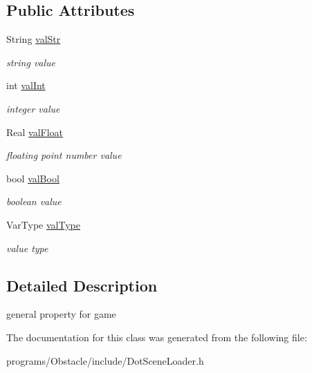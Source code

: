 \subsection*{Public Attributes}
\begin{DoxyCompactItemize}
\item 
String \hyperlink{class_ogre_1_1_general_property_a3e9138cfd8008b21c7cb5c8a501a0b45}{val\+Str}\hypertarget{class_ogre_1_1_general_property_a3e9138cfd8008b21c7cb5c8a501a0b45}{}\label{class_ogre_1_1_general_property_a3e9138cfd8008b21c7cb5c8a501a0b45}

\begin{DoxyCompactList}\small\item\em string value \end{DoxyCompactList}\item 
int \hyperlink{class_ogre_1_1_general_property_a6ac15b8c8fb3d4b2400e270789738502}{val\+Int}\hypertarget{class_ogre_1_1_general_property_a6ac15b8c8fb3d4b2400e270789738502}{}\label{class_ogre_1_1_general_property_a6ac15b8c8fb3d4b2400e270789738502}

\begin{DoxyCompactList}\small\item\em integer value \end{DoxyCompactList}\item 
Real \hyperlink{class_ogre_1_1_general_property_a565d787d48946ff24b7e3ea8dd26e434}{val\+Float}\hypertarget{class_ogre_1_1_general_property_a565d787d48946ff24b7e3ea8dd26e434}{}\label{class_ogre_1_1_general_property_a565d787d48946ff24b7e3ea8dd26e434}

\begin{DoxyCompactList}\small\item\em floating point number value \end{DoxyCompactList}\item 
bool \hyperlink{class_ogre_1_1_general_property_a0b539cf11887b0c312ac261e5c86b572}{val\+Bool}\hypertarget{class_ogre_1_1_general_property_a0b539cf11887b0c312ac261e5c86b572}{}\label{class_ogre_1_1_general_property_a0b539cf11887b0c312ac261e5c86b572}

\begin{DoxyCompactList}\small\item\em boolean value \end{DoxyCompactList}\item 
Var\+Type \hyperlink{class_ogre_1_1_general_property_aa961cf3f31323ed235856a91d1b5e30a}{val\+Type}\hypertarget{class_ogre_1_1_general_property_aa961cf3f31323ed235856a91d1b5e30a}{}\label{class_ogre_1_1_general_property_aa961cf3f31323ed235856a91d1b5e30a}

\begin{DoxyCompactList}\small\item\em value type \end{DoxyCompactList}\end{DoxyCompactItemize}


\subsection{Detailed Description}
general property for game 

The documentation for this class was generated from the following file\+:\begin{DoxyCompactItemize}
\item 
programs/\+Obstacle/include/Dot\+Scene\+Loader.\+h\end{DoxyCompactItemize}
